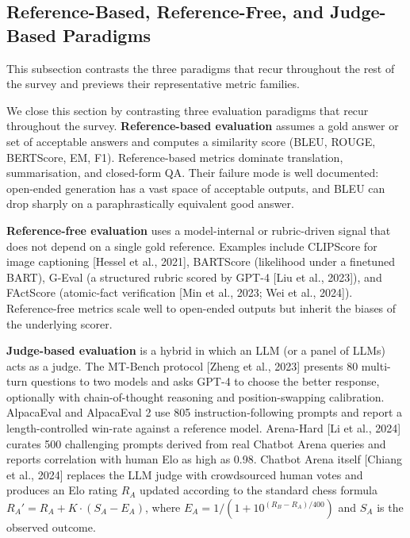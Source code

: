 \subsection{Reference-Based, Reference-Free, and Judge-Based Paradigms}\label{reference-based-reference-free-and-judge-based-paradigms}

This subsection contrasts the three paradigms that recur throughout the rest of the survey and previews their representative metric families.

We close this section by contrasting three evaluation paradigms that recur throughout the survey. \textbf{Reference-based evaluation} assumes a gold answer or set of acceptable answers and computes a similarity score (BLEU, ROUGE, BERTScore, EM, F1). Reference-based metrics dominate translation, summarisation, and closed-form QA. Their failure mode is well documented: open-ended generation has a vast space of acceptable outputs, and BLEU can drop sharply on a paraphrastically equivalent good answer.

\textbf{Reference-free evaluation} uses a model-internal or rubric-driven signal that does not depend on a single gold reference. Examples include CLIPScore for image captioning {[}Hessel et al., 2021{]}, BARTScore (likelihood under a finetuned BART), G-Eval (a structured rubric scored by GPT-4 {[}Liu et al., 2023{]}), and FActScore (atomic-fact verification {[}Min et al., 2023; Wei et al., 2024{]}). Reference-free metrics scale well to open-ended outputs but inherit the biases of the underlying scorer.

\textbf{Judge-based evaluation} is a hybrid in which an LLM (or a panel of LLMs) acts as a judge. The MT-Bench protocol {[}Zheng et al., 2023{]} presents 80 multi-turn questions to two models and asks GPT-4 to choose the better response, optionally with chain-of-thought reasoning and position-swapping calibration. AlpacaEval and AlpacaEval 2 use 805 instruction-following prompts and report a length-controlled win-rate against a reference model. Arena-Hard {[}Li et al., 2024{]} curates 500 challenging prompts derived from real Chatbot Arena queries and reports correlation with human Elo as high as 0.98. Chatbot Arena itself {[}Chiang et al., 2024{]} replaces the LLM judge with crowdsourced human votes and produces an Elo rating \(R_A\) updated according to the standard chess formula \(R_A' = R_A + K \cdot (S_A - E_A)\), where \(E_A = 1 / (1 + 10^{(R_B - R_A)/400})\) and \(S_A\) is the observed outcome.

